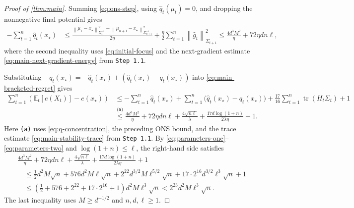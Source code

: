 \documentclass[11pt]{article}
\newcommand{\reason}[1]{\texttt{(#1)}}
\newcommand{\explan}[2]{\stackrel{\reason{#2}}{#1}}
\newcommand{\E}{\mathbb E}
\newcommand{\tr}{\operatorname{tr}}
\newcommand{\1}{\mathbf 1}
\newcommand{\normm}[2]{\left\lVert #1\right\rVert_{#2}}
\begin{document}
\begin{proof}[Proof of \cref{thm:main}]
    Summing \eqref{eq:ons-step}, using
    $\widehat q_t(\mu_t)=0$, and dropping the nonnegative final potential
    gives
    \begin{align}
        -\sum_{t=1}^n\widehat q_t(x_\star)
         & \leq
        \frac{
            \normm{\mu_1-x_\star}{\Sigma_1^{-1}}^2
            -\normm{\mu_{n+1}-x_\star}{\Sigma_{n+1}^{-1}}^2
        }{2\eta}
        +\frac\eta2\sum_{t=1}^n
        \normm{\widehat g_t}{\Sigma_{t+1}}^2
        \leq
        \frac{4d^3M^2}{\eta}
        +72\eta dn\ell,
    \end{align}
    where the second inequality uses \eqref{eq:initial-focus} and the
    next-gradient estimate \eqref{eq:main-next-gradient-energy} from
    \texttt{Step 1.1}.

    Substituting
    $-q_t(x_\star)=-\widehat q_t(x_\star)
        +(\widehat q_t(x_\star)-q_t(x_\star))$
    into \eqref{eq:main-bracketed-regret} gives
    \begin{align}
        \sum_{t=1}^n
        \left(\E_t[e(X_t)]-e(x_\star)\right)
         & \leq
        -\sum_{t=1}^n\widehat q_t(x_\star)
        +\sum_{t=1}^n
        \bigl(\widehat q_t(x_\star)-q_t(x_\star)\bigr)
        +\frac{17}{16}\sum_{t=1}^n\tr(H_t\Sigma_t)
        +1
        \nonumber           \\
         & \explan{\leq}{a}
        \frac{4d^3M^2}{\eta}
        +72\eta dn\ell
        +\frac{4\sqrt{n\ell}}{\lambda}
        +\frac{17d\log(1+n)}{2\lambda\eta}
        +1.
        \label{eq:main-extension-budget}
    \end{align}
    Here \reason{a} uses \eqref{eq:q-concentration}, the preceding ONS
    bound, and the trace estimate \eqref{eq:main-stability-trace} from
    \texttt{Step 1.1}.
    By \eqref{eq:parameters-one}--\eqref{eq:parameters-two} and
    $\log(1+n)\leq\ell$, the right-hand side satisfies
    \begin{align}
         & \frac{4d^3M^2}{\eta}
        +72\eta dn\ell
        +\frac{4\sqrt{n\ell}}{\lambda}
        +\frac{17d\log(1+n)}{2\lambda\eta}
        +1
        \nonumber               \\
         & \quad\leq
        \frac12d^2M\sqrt n
        +576d^2M\ell\sqrt n
        +2^{22}d^{3/2}M\ell^{5/2}\sqrt n
        +17\cdot2^{16}d^{3/2}\ell^3\sqrt n
        +1
        \nonumber               \\
         & \quad\leq
        \left(
        \frac12
        +576
        +2^{22}
        +17\cdot2^{16}
        +1
        \right)d^2M\ell^3\sqrt n
        <
        2^{23}d^2M\ell^3\sqrt n.
        \label{eq:main-extension-regret}
    \end{align}
    The last inequality uses $M\geq d^{-1/2}$ and
    $n,d,\ell\geq1$.


\end{proof}
\end{document}
